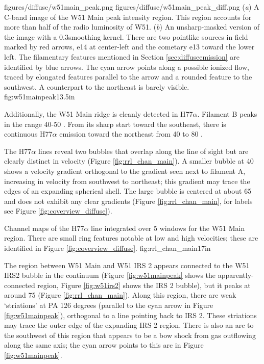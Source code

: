 \FigureTwo
{figures/diffuse/w51main_peak.png}
{figures/diffuse/w51main_peak_diff.png}
{({\it a}) A C-band image of the W51 Main peak intensity region.  This region
accounts for more than half of the radio luminosity of W51.
({\it b}) An unsharp-masked version of the image with a 0.3\arcsec smoothing
kernel. 
There are
two pointlike sources in field marked by red arrows, e14 at center-left and the
cometary e13 toward the lower left.
The filamentary features mentioned in Section \ref{sec:diffuseemission} are
identified by blue arrows.  The cyan arrow points along a possible ionized flow,
traced by elongated features parallel to the arrow and a rounded feature to the
southwest.  A counterpart to the northeast is barely visible.
}
{fig:w51mainpeak}{1}{3.5in}

Additionally, the W51 Main ridge is cleanly detected in H77$\alpha$.  Filament
B peaks in the range 40-50 \kms.  From its sharp start toward the southeast,
there is continuous H77$\alpha$ emission toward the northeast from 40 to 80
\kms.

The H77$\alpha$ lines reveal two bubbles that overlap along the line of sight
but are clearly distinct in velocity (Figure \ref{fig:rrl_chan_main}).  A
smaller bubble at 40 \kms shows a velocity gradient orthogonal to the gradient
seen next to filament A, increasing in velocity from southwest to northeast;
this gradient may trace the edges of an expanding spherical shell.  The large
bubble is centered at about 65 \kms and does not exhibit any clear gradients
(Figure \ref{fig:rrl_chan_main}, for labels see Figure
\ref{fig:coverview_diffuse}).

{Channel maps of the H77$\alpha$ line integrated over 5 \kms windows
for the W51 Main region.  There are small ring features notable at low and high
velocities; these are identified in Figure \ref{fig:coverview_diffuse}.}
{fig:rrl_chan_main}{1}{7in}

The \hii region between W51 Main and W51 IRS 2 appears connected to the W51 IRS2
bubble in the continuum (Figure \ref{fig:w51mainpeak} shows the
apparently-connected region, Figure \ref{fig:w51irs2} shows the IRS 2 bubble),
but it peaks at around 75 \kms (Figure \ref{fig:rrl_chan_main}).  Along this
region, there are weak `striations' at PA 126 degrees (parallel to the cyan
arrow in Figure \ref{fig:w51mainpeak}), orthogonal to a line pointing back to
IRS 2.  These striations  may trace the outer edge of the expanding IRS 2
region.  There is also an arc to the southwest of this region that appears to
be a bow shock from gas outflowing along the same axis; the cyan arrow points
to this arc in Figure \ref{fig:w51mainpeak}.

